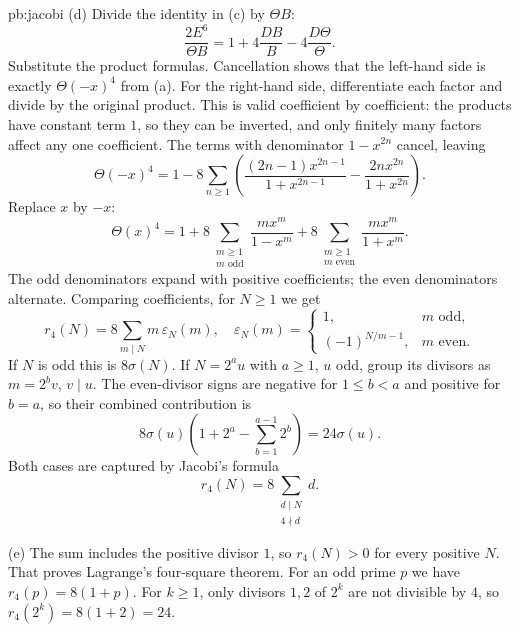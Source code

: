 \begin{solution}{pb:jacobi}
(d) Divide the identity in (c) by $\Theta B$:
\[
\frac{2E^6}{\Theta B}
=1+4\frac{DB}{B}-4\frac{D\Theta}{\Theta}.
\]
Substitute the product formulas. Cancellation shows that the left-hand side is exactly $\Theta(-x)^4$ from (a). For the right-hand side, differentiate each factor and divide by the original product. This is valid coefficient by coefficient:
the products have constant term $1$, so they can be inverted, and
only finitely many factors affect any one coefficient.
The terms with denominator $1-x^{2n}$ cancel, leaving
\[
\Theta(-x)^4
=1-8\sum_{n\ge1}
\left(\frac{(2n-1)x^{2n-1}}{1+x^{2n-1}}
     -\frac{2nx^{2n}}{1+x^{2n}}\right).
\]
Replace $x$ by $-x$:
\[
\Theta(x)^4
=1+8\sum_{\substack{m\ge1\\m\text{ odd}}}
\frac{mx^m}{1-x^m}
+8\sum_{\substack{m\ge1\\m\text{ even}}}
\frac{mx^m}{1+x^m}.
\]
The odd denominators expand with positive coefficients; the even denominators alternate. Comparing coefficients, for $N\ge1$ we get
\[
r_4(N)=8\sum_{m\mid N}m\,\varepsilon_N(m),
\quad
\varepsilon_N(m)=
\begin{cases}
1,&m\text{ odd},\\
(-1)^{N/m-1},&m\text{ even}.
\end{cases}
\]
If $N$ is odd this is $8\sigma(N)$. If $N=2^au$ with $a\ge1$, $u$ odd, group its divisors as $m=2^bv$, $v\mid u$. The even-divisor signs are negative for $1\le b<a$ and positive for $b=a$, so their combined contribution is
\[
8\sigma(u)\left(1+2^a-\sum_{b=1}^{a-1}2^b\right)
=24\sigma(u).
\]
Both cases are captured by Jacobi's formula
\[
\boxed{r_4(N)=8\sum_{\substack{d\mid N\\4\nmid d}}d}.
\]

(e) The sum includes the positive divisor $1$, so $r_4(N)>0$ for every positive $N$. That proves Lagrange's four-square theorem. For an odd prime $p$ we have
$r_4(p)=8(1+p)$. For $k\ge1$, only divisors $1,2$ of $2^k$ are not divisible by $4$, so $r_4(2^k)=8(1+2)=24$.


\end{solution}
